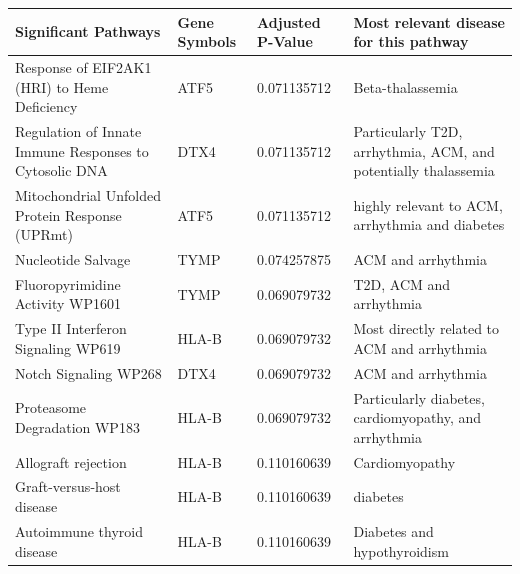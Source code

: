 \begin{table}[H]
    \centering
    \begin{tabular}{|p{4cm}|p{3cm}|p{2cm}|p{4cm}|}
        \hline
        Significant Pathways & Gene Symbols & Adjusted P-Value & Most relevant disease for this pathway \\
        \hline
        Response of EIF2AK1 (HRI) to Heme Deficiency & ATF5 & 0.071135712 & Beta-thalassemia \\
        \hline
        Regulation of Innate Immune Responses to Cytosolic DNA & DTX4 & 0.071135712 & Particularly T2D, arrhythmia, ACM, and potentially thalassemia \\
        \hline
        Mitochondrial Unfolded Protein Response (UPRmt) & ATF5 & 0.071135712 & highly relevant to ACM, arrhythmia and diabetes \\
        \hline
        Nucleotide Salvage & TYMP & 0.074257875 & ACM and arrhythmia \\
        \hline
        Fluoropyrimidine Activity WP1601 & TYMP & 0.069079732 & T2D, ACM and arrhythmia \\
        \hline
        Type II Interferon Signaling WP619 & HLA-B & 0.069079732 & Most directly related to ACM and arrhythmia \\
        \hline
        Notch Signaling WP268 & DTX4 & 0.069079732 & ACM and arrhythmia \\
        \hline
        Proteasome Degradation WP183 & HLA-B & 0.069079732 & Particularly diabetes, cardiomyopathy, and arrhythmia \\
        \hline
        Allograft rejection & HLA-B & 0.110160639 & Cardiomyopathy \\
        \hline
        Graft-versus-host disease & HLA-B & 0.110160639 & diabetes \\
        \hline
        Autoimmune thyroid disease & HLA-B & 0.110160639 & Diabetes and hypothyroidism \\
        \hline
    \end{tabular}
    
    \label{tab:significant_pathways}
\end{table}

